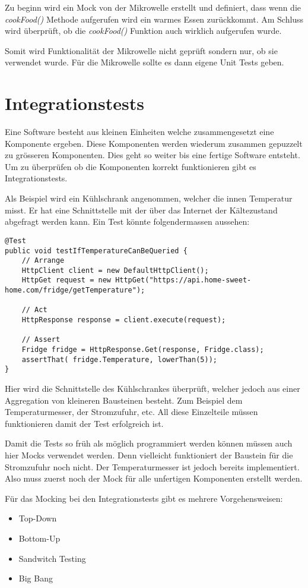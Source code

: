Zu beginn wird ein Mock von der Mikrowelle erstellt und definiert, dass wenn die \textit{cookFood()} Methode aufgerufen wird ein warmes Essen zurückkommt. Am Schluss wird überprüft, ob die \textit{cookFood()} Funktion auch wirklich aufgerufen wurde.

Somit wird Funktionalität der Mikrowelle nicht geprüft sondern nur, ob sie verwendet wurde. Für die Mikrowelle sollte es dann eigene Unit Tests geben.

\section{Integrationstests}
Eine Software besteht aus kleinen Einheiten welche zusammengesetzt eine Komponente ergeben. Diese Komponenten werden wiederum zusammen gepuzzelt zu grösseren Komponenten. Dies geht so weiter bis eine fertige Software entsteht. Um zu überprüfen ob die Komponenten korrekt funktionieren gibt es Integrationstests.

Als Beispiel wird ein Kühlschrank angenommen, welcher die innen Temperatur misst. Er hat eine Schnittstelle mit der über das Internet der Kältezustand abgefragt werden kann. Ein Test könnte folgendermassen aussehen:


\begin{lstlisting}
@Test
public void testIfTemperatureCanBeQueried {
	// Arrange
	HttpClient client = new DefaultHttpClient();
    HttpGet request = new HttpGet("https://api.home-sweet-home.com/fridge/getTemperature");
 
    // Act
    HttpResponse response = client.execute(request);
 
    // Assert
    Fridge fridge = HttpResponse.Get(response, Fridge.class);
    assertThat( fridge.Temperature, lowerThan(5));
}
\end{lstlisting}

Hier wird die Schnittstelle des Kühlschrankes überprüft, welcher jedoch aus einer Aggregation von kleineren Bausteinen besteht. Zum Beispiel dem Temperaturmesser, der Stromzufuhr, etc. All diese Einzelteile müssen funktionieren damit der Test erfolgreich ist. 

Damit die Tests so früh als möglich programmiert werden können müssen auch hier Mocks verwendet werden. Denn vielleicht funktioniert der Baustein für die Stromzufuhr noch nicht. Der Temperaturmesser ist jedoch bereits implementiert. Also muss zuerst noch der Mock für alle unfertigen Komponenten erstellt werden. 

Für das Mocking bei den Integrationstests gibt es mehrere Vorgehensweisen:
\begin{itemize}
\item Top-Down
\item Bottom-Up
\item Sandwitch Testing
\item Big Bang
\end{itemize}


